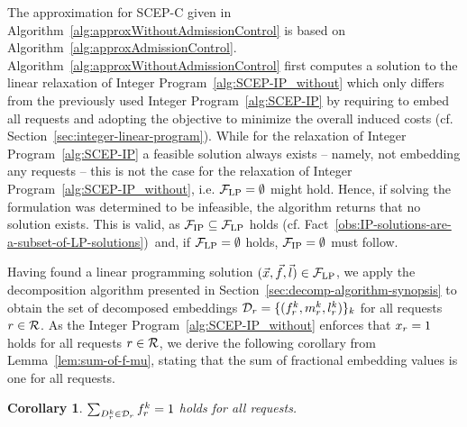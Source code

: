 \documentclass[10pt, conference, letterpaper]{IEEEtran}
\newtheorem{corollary}[theorem]{Corollary}
\begin{document}
The approximation for SCEP-C given in Algorithm~\ref{alg:approxWithoutAdmissionControl} is based on Algorithm~\ref{alg:approxAdmissionControl}. Algorithm~\ref{alg:approxWithoutAdmissionControl} first computes a solution to the linear relaxation of Integer Program~\ref{alg:SCEP-IP_without} which only differs from the previously used Integer Program~\ref{alg:SCEP-IP} by requiring to embed all requests and adopting the objective to minimize the overall induced costs (cf. Section~\ref{sec:integer-linear-program}). While for the relaxation of Integer Program~\ref{alg:SCEP-IP} a feasible solution always exists -- namely, not embedding any requests -- this is not the case for the relaxation of Integer Program~\ref{alg:SCEP-IP_without}, i.e. $\mathcal{F}_{\textnormal{LP}} = \emptyset$ might hold. Hence, if solving the formulation was determined to be infeasible, the algorithm returns that no solution exists. This is valid, as $\mathcal{F}_{\textnormal{IP}} \subseteq \mathcal{F}_{\textnormal{LP}}$ holds (cf. Fact~\ref{obs:IP-solutions-are-a-subset-of-LP-solutions})~and, if $\mathcal{F}_{\textnormal{LP}} = \emptyset$ holds, $\mathcal{F}_{\textnormal{IP}} = \emptyset$ must follow. 

Having found a linear programming solution $(\vec{x}, \vec{f}, \vec{l}) \in  \mathcal{F}_{\textnormal{LP}}$, we apply the decomposition algorithm presented in Section~\ref{sec:decomp-algorithm-synopsis} to obtain the set of decomposed embeddings $\PotEmbeddings = \{(\prob,\mapping,\load)\}_k$ for all requests $r \in \mathcal{R}$. As the Integer Program~\ref{alg:SCEP-IP_without} enforces that $x_{r} = 1$ holds for all requests $r \in \mathcal{R}$, we derive  the following corollary  from Lemma~\ref{lem:sum-of-f-mu}, stating that the sum of fractional embedding values is one for all requests.

\begin{corollary}
\label{cor:full-fractional-embeddings-cost}
$\sum_{\decomp \in \PotEmbeddings} \prob = 1$ holds for all requests.
\end{corollary}
\end{document}
